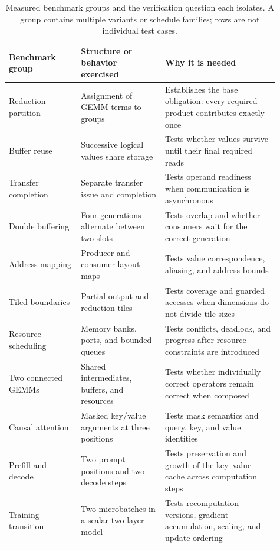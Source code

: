 \documentclass[11pt]{article}
\begin{document}
\begin{table}[htbp]
\centering\small
\begin{tabular}{p{0.24\linewidth}p{0.29\linewidth}p{0.38\linewidth}}
\toprule
Benchmark group & Structure or behavior exercised & Why it is needed \\
\midrule
Reduction partition & Assignment of GEMM terms to groups & Establishes the base obligation: every required product contributes exactly once \\
Buffer reuse & Successive logical values share storage & Tests whether values survive until their final required reads \\
Transfer completion & Separate transfer issue and completion & Tests operand readiness when communication is asynchronous \\
Double buffering & Four generations alternate between two slots & Tests overlap and whether consumers wait for the correct generation \\
Address mapping & Producer and consumer layout maps & Tests value correspondence, aliasing, and address bounds \\
Tiled boundaries & Partial output and reduction tiles & Tests coverage and guarded accesses when dimensions do not divide tile sizes \\
Resource scheduling & Memory banks, ports, and bounded queues & Tests conflicts, deadlock, and progress after resource constraints are introduced \\
Two connected GEMMs & Shared intermediates, buffers, and resources & Tests whether individually correct operators remain correct when composed \\
\midrule
Causal attention & Masked key/value arguments at three positions & Tests mask semantics and query, key, and value identities \\
Prefill and decode & Two prompt positions and two decode steps & Tests preservation and growth of the key--value cache across computation steps \\
Training transition & Two microbatches in a scalar two-layer model & Tests recomputation versions, gradient accumulation, scaling, and update ordering \\
\bottomrule
\end{tabular}
\caption{Measured benchmark groups and the verification question each isolates. A group contains multiple variants or schedule families; rows are not individual test cases.}\label{tab:measured-benchmarks}
\end{table}
\end{document}
